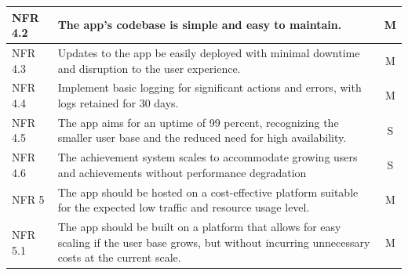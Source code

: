 \begin{tabularx}{\textwidth}{|l|X|c|}
\hline
NFR 4.2 & The app’s codebase is simple and easy to maintain. & M \\
\hline
NFR 4.3 & Updates to the app be easily deployed with minimal downtime and disruption to the user experience. & M \\
\hline
NFR 4.4 & Implement basic logging for significant actions and errors, with logs retained for 30 days. & M \\
\hline
NFR 4.5 & The app aims for an uptime of 99 percent, recognizing the smaller user base and the reduced need for high availability. & S \\
\hline
NFR 4.6 & The achievement system scales to accommodate growing users and achievements without performance degradation & S \\
\hline
NFR 5 & The app should be hosted on a cost-effective platform suitable for the expected low traffic and resource usage level. & M \\
\hline
NFR 5.1 & The app should be built on a platform that allows for easy scaling if the user base grows, but without incurring unnecessary costs at the current scale. & M \\
\hline
\end{tabularx}

